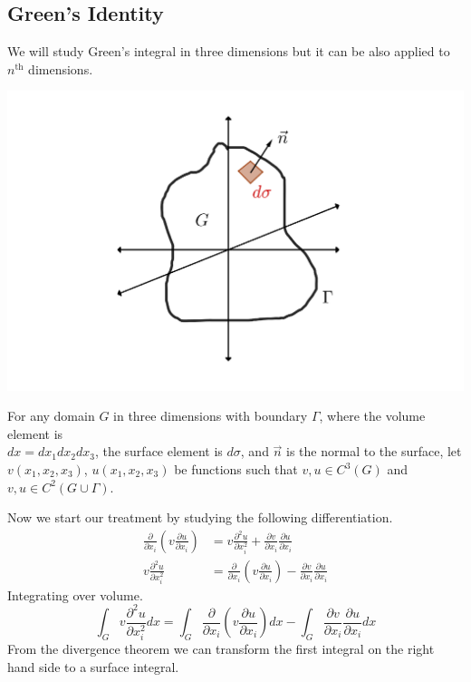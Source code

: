 \documentclass[]{article}
\begin{document}
\subsection{Green's Identity}
We will study Green's integral in three dimensions but it can be also applied to $n^{\text{th}}$ dimensions.
\begin{center}
\includegraphics[scale=0.2]{green.png}
\end{center}
For any domain $G$ in three dimensions with boundary $\Gamma$, where the volume element is
\\
$dx = dx_1 dx_2 dx_3$, the surface element is $d\sigma$, and $\vec{n}$ is the normal to the surface, let $v(x_1,x_2,x_3)$, $u(x_1,x_2,x_3)$ be functions such that $v,u\in C^3(G)$ and $v,u\in C^2(G\cup \Gamma)$.
\par
Now we start our treatment by studying the following differentiation. 
\begin{align*}
\frac{\partial }{\partial x_i}\left(v\frac{\partial u}{\partial x_i}\right) &= v\frac{\partial^2 u}{\partial x_{i}^{2}} + \frac{\partial v}{\partial x_i}\frac{\partial u}{\partial x_i}
\\
v\frac{\partial^2 u}{\partial x_{i}^{2}} &= \frac{\partial }{\partial x_i}\left(v\frac{\partial u}{\partial x_i}\right) - \frac{\partial v}{\partial x_i}\frac{\partial u}{\partial x_i}
\end{align*}
Integrating over volume.
\[
    \int_G v\frac{\partial^2 u}{\partial x_{i}^{2}} dx = \int_G \frac{\partial }{\partial x_i}\left(v\frac{\partial u}{\partial x_i}\right) dx - \int_G \frac{\partial v}{\partial x_i}\frac{\partial u}{\partial x_i} dx    
\]
From the divergence theorem we can transform the first integral on the right hand side to a surface integral.
\end{document}
